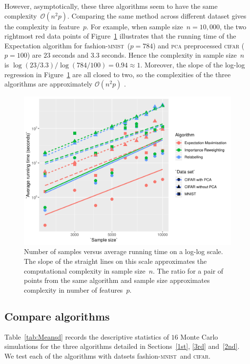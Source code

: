 \documentclass[12pt]{article} %
\newcommand{\mnist}{fashion-\textsc{mnist}}
\begin{document}
However, asymptotically, these three algorithms seem to have the same complexity~$\mathcal{O}(n^2p)$. Comparing the same method across different dataset gives the complexity in feature~$p$. For example, when sample size~$n=10,000$, the two rightmost red data points of Figure~\ref{fig:speed} illustrates that the running time of the Expectation  algorithm for \mnist\ ($p=784$) and \textsc{pca} preprocessed \textsc{cifar} ($p=100$) are $23$ seconds and $3.3$ seconds. Hence the complexity in sample size~$n$ is 
\begin{math}
    \log(23/3.3)/\log(784/100)=0.94 \approx 1.
\end{math}
Moreover, the slope of the log-log regression in Figure~\ref{fig:speed} are all closed to two, so the complexities of the three algorithms are approximately $\mathcal{O}(n^2p)$ \citep{Roberts:2014:MED:2746455}. 
\begin{figure}
	\centering
    \includegraphics[scale=.8]{speed}%
	\caption{ Number of samples versus average running time on a log-log scale. The slope of the straight lines on this scale approximates the computational complexity in sample size~$n$. The ratio for a pair of points from the same algorithm and sample size approximates complexity in number of features~$p$.
}
	\label{fig:speed}
\end{figure}
\subsection{Compare algorithms}

Table~\ref{tab:Meansd} records the descriptive statistics of $16$ Monte Carlo simulations for the three algorithms detailed in Sections~\ref{1st}, \ref{3rd} and~\ref{2nd}.  We test each of the algorithms with datsets \mnist\ and \textsc{cifar}.
\end{document}
